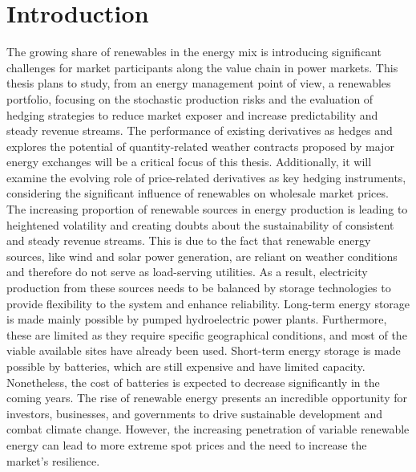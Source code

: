 
%

\chapter{Introduction}
\label{ch:introduction}

\glsresetall


  The growing share of renewables in the energy mix is introducing significant challenges for market participants
  along the value chain in power markets\cite{hain_managing_2018}.
  This thesis plans to study, from an energy management point of view, a renewables portfolio,
  focusing on the stochastic production risks and the evaluation of hedging strategies
  to reduce market exposer and increase predictability and steady revenue streams.
  The performance of existing derivatives as hedges and explores the potential of quantity-related weather contracts
  proposed by major energy exchanges will be a critical focus of this thesis.
  Additionally, it will examine the evolving role of price-related derivatives as key hedging instruments,
  considering the significant influence of renewables on wholesale market prices.\\

  The increasing proportion of renewable sources in energy production is leading to heightened volatility
  and creating doubts about the sustainability of consistent and steady revenue streams.
  This is due to the fact that renewable energy sources, like wind and solar power generation,
  are reliant on weather conditions and therefore do not serve as load-serving utilities.
  As a result, electricity production from these sources needs
  to be balanced by storage technologies to provide flexibility to the system and enhance reliability.
  Long-term energy storage is made mainly possible by pumped hydroelectric power plants.
  Furthermore, these are limited as they require specific geographical conditions,
  and most of the viable available sites have already been used.
  Short-term energy storage is made possible by batteries, which are still expensive and have limited capacity.
  Nonetheless, the cost of batteries is expected to decrease significantly in the coming
  years\cite{viswanathan_2022_2022, cole_cost_2023}.
  The rise of renewable energy presents an incredible opportunity for investors,
  businesses, and governments to drive sustainable development and combat climate change.
  However, the increasing penetration of variable renewable energy can lead to more extreme spot prices and the need
  to increase the market's resilience. \\

